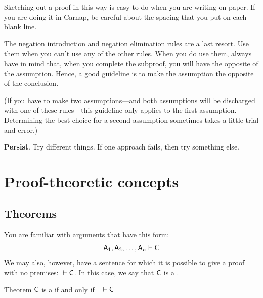 \begin{earg}
Sketching out a proof in this way is easy to do when you are writing on paper. If you are doing it in Carnap, be careful about the spacing that you put on each blank line.

\medskip

\item[\ex{18-7}] The negation introduction and negation elimination rules are a last resort. Use them when you can't use any of the other rules. When you do use them, always have in mind that, when you complete the subproof, you will have the opposite of the assumption. Hence, a good guideline is to make the assumption the opposite of the conclusion. 

(If you have to make two assumptions---and both assumptions will be discharged with one of these rules---this guideline only applies to the first assumption. Determining the best choice for a second assumption sometimes takes a little trial and error.)  
\medskip

\item[\ex{18-8}] \textbf{Persist}. Try different things. If one approach fails, then try something else.
\end{earg}




\chapter{Proof-theoretic concepts}\label{s:ProofTheoreticConcepts}

\section{Theorems}\label{s:theorems}

You are familiar with arguments that have this form:
$$\mathsf{A}_1, \mathsf{A}_2, \ldots, \mathsf{A}_n \vdash \mathsf{C}$$
We may also, however, have a sentence for which it is possible to give a proof with no premises: ${} \vdash \mathsf{C}$. In this case, we say that $\mathsf{C}$ is a .

\begin{factboxy}{Theorem}\label{def:syntactic_tautology_in_sl}
$\mathsf{C}$ is a  if and only if ~ $\vdash \mathsf{C}$
\end{factboxy}

